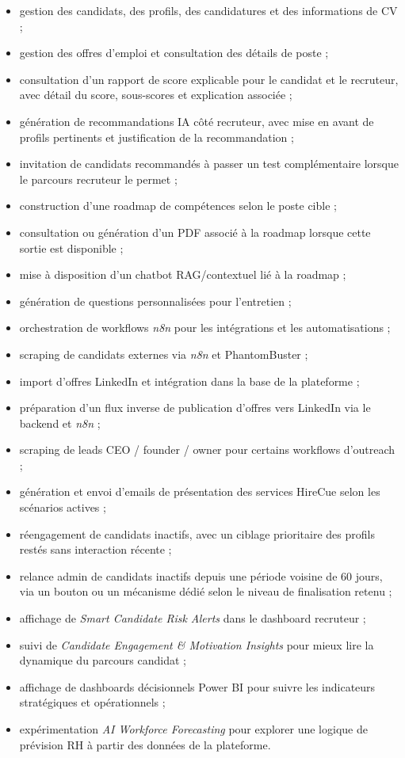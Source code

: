 \begin{itemize}
\item gestion des candidats, des profils, des candidatures et des informations de CV ;
\item gestion des offres d'emploi et consultation des détails de poste ;
\item consultation d'un rapport de score explicable pour le candidat et le recruteur, avec détail du score, sous-scores et explication associée ;
\item génération de recommandations IA côté recruteur, avec mise en avant de profils pertinents et justification de la recommandation ;
\item invitation de candidats recommandés à passer un test complémentaire lorsque le parcours recruteur le permet ;
\item construction d'une roadmap de compétences selon le poste cible ;
\item consultation ou génération d'un PDF associé à la roadmap lorsque cette sortie est disponible ;
\item mise à disposition d'un chatbot RAG/contextuel lié à la roadmap ;
\item génération de questions personnalisées pour l'entretien ;
\item orchestration de workflows \textit{n8n} pour les intégrations et les automatisations ;
\item scraping de candidats externes via \textit{n8n} et PhantomBuster ;
\item import d'offres LinkedIn et intégration dans la base de la plateforme ;
\item préparation d'un flux inverse de publication d'offres vers LinkedIn via le backend et \textit{n8n} ;
\item scraping de leads CEO / founder / owner pour certains workflows d'outreach ;
\item génération et envoi d'emails de présentation des services HireCue selon les scénarios actives ;
\item réengagement de candidats inactifs, avec un ciblage prioritaire des profils restés sans interaction récente ;
\item relance admin de candidats inactifs depuis une période voisine de 60 jours, via un bouton ou un mécanisme dédié selon le niveau de finalisation retenu ;
\item affichage de \textit{Smart Candidate Risk Alerts} dans le dashboard recruteur ;
\item suivi de \textit{Candidate Engagement \& Motivation Insights} pour mieux lire la dynamique du parcours candidat ;
\item affichage de dashboards décisionnels Power BI pour suivre les indicateurs stratégiques et opérationnels ;
\item expérimentation \textit{AI Workforce Forecasting} pour explorer une logique de prévision RH à partir des données de la plateforme.
\end{itemize}


